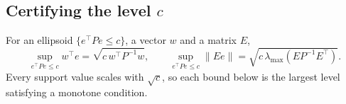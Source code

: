\documentclass[11pt,a4paper]{article}
\newcommand{\B}{\mathcal{B}}
\begin{document}
\begin{table}[t]
\centering\small
\begin{minipage}[t]{0.44\linewidth}\centering
\caption{LQR weights. $^\dagger$\,changed.}
\label{tab:lqrw}

\end{minipage}\hfill
\begin{minipage}[t]{0.52\linewidth}\centering
\caption{Base set at $c_{\B}=\cB$ and closed-loop facts.}
\label{tab:extents}

\end{minipage}
\end{table}

\subsection{Certifying the level \texorpdfstring{$c$}{c}}\label{sec:levels}
For an ellipsoid $\{e^\top Pe\le c\}$, a vector $w$ and a matrix $E$,
\begin{equation}
\sup_{e^\top Pe\le c} w^\top e=\sqrt{c\,w^\top P^{-1}w},\qquad
\sup_{e^\top Pe\le c}\|Ee\|=\sqrt{c\,\lambda_{\max}(EP^{-1}E^\top)} .
\label{eq:support}
\end{equation}
Every support value scales with $\sqrt c$, so each bound below is the largest level satisfying a
monotone condition.
\end{document}
